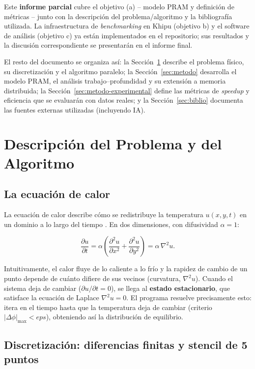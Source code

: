 \documentclass[11pt,a4paper]{article}
\begin{document}
	Este \textbf{informe parcial} cubre el objetivo (a) -- modelo PRAM y definición
	de métricas -- junto con la descripción del problema/algoritmo y la
	bibliografía utilizada. La infraestructura de \textit{benchmarking} en Khipu
	(objetivo b) y el software de análisis (objetivo c) ya están implementados en
	el repositorio; sus resultados y la discusión correspondiente se presentarán en
	el informe final.

	El resto del documento se organiza así: la Sección~\ref{sec:problema} describe el
	problema físico, su discretización y el algoritmo paralelo; la
	Sección~\ref{sec:metodo} desarrolla el modelo PRAM, el análisis
	trabajo--profundidad y su extensión a memoria distribuida; la
	Sección~\ref{sec:metodo-experimental} define las métricas de \textit{speedup} y
	eficiencia que se evaluarán con datos reales; y la Sección~\ref{sec:biblio}
	documenta las fuentes externas utilizadas (incluyendo IA).

	\section{Descripción del Problema y del Algoritmo}
	\label{sec:problema}

	\subsection{La ecuación de calor}
	\enlargethispage{4 \baselineskip}
	La ecuación de calor describe cómo se redistribuye la temperatura $u(x,y,t)$ en
	un dominio a lo largo del tiempo \cite{strauss-pde}. En dos dimensiones, con
	difusividad $\alpha = 1$:

	\[
	\frac{\partial u}{\partial t} = \alpha \left( \frac{\partial^2 u}{\partial x^2}
	+ \frac{\partial^2 u}{\partial y^2} \right) = \alpha\,\nabla^2 u .
	\]
	
	Intuitivamente, el calor fluye de lo caliente a lo frío y la rapidez de cambio de un punto depende de cuánto difiere de sus vecinos (curvatura, $\nabla^2 u$).
	Cuando el sistema deja de cambiar ($\partial u/\partial t = 0$), se llega al
	\textbf{estado estacionario}, que satisface la ecuación de Laplace
	$\nabla^2 u = 0$. El programa resuelve precisamente esto: itera en el tiempo
	hasta que la temperatura deja de cambiar (criterio $|\Delta\phi|_{\max} < eps$),
	obteniendo así la distribución de equilibrio.

	\subsection{Discretización: diferencias finitas y stencil de 5 puntos}
\end{document}
